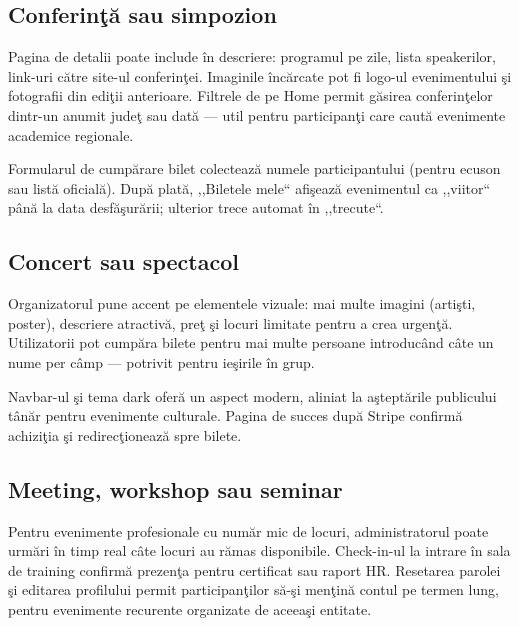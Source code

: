 \subsection{Conferin\c t\u a sau simpozion}

Pagina de detalii poate include \^in descriere: programul pe zile, lista speakerilor, link-uri c\u atre site-ul conferin\c tei. Imaginile \^inc\u arcate pot fi logo-ul evenimentului \c si fotografii din edi\c tii anterioare. Filtrele de pe Home permit g\u asirea conferin\c telor dintr-un anumit jude\c t sau dat\u a — util pentru participan\c ti care caut\u a evenimente academice regionale.

Formularul de cump\u arare bilet colecteaz\u a numele participantului (pentru ecuson sau list\u a oficial\u a). Dup\u a plat\u a, ,,Biletele mele`` afi\c seaz\u a evenimentul ca ,,viitor`` p\^an\u a la data desf\u a\c sur\u arii; ulterior trece automat \^in ,,trecute``.

\subsection{Concert sau spectacol}

Organizatorul pune accent pe elementele vizuale: mai multe imagini (arti\c sti, poster), descriere atractiv\u a, pre\c t \c si locuri limitate pentru a crea urgen\c t\u a. Utilizatorii pot cump\u ara bilete pentru mai multe persoane introduc\^and c\^ate un nume per c\^amp — potrivit pentru ie\c sirile \^in grup.

Navbar-ul \c si tema dark ofer\u a un aspect modern, aliniat la a\c stept\u arile publicului t\^an\u ar pentru evenimente culturale. Pagina de succes dup\u a Stripe confirm\u a achizi\c tia \c si \linebreak redirec\c tioneaz\u a spre bilete.

\subsection{Meeting, workshop sau seminar}

Pentru evenimente profesionale cu num\u ar mic de locuri, administratorul poate urm\u ari \^in timp real c\^ate locuri au r\u amas disponibile. Check-in-ul la intrare \^in sala de training confirm\u a prezen\c ta pentru certificat sau raport HR. Resetarea parolei \c si editarea profilului permit participan\c tilor s\u a-\c si men\c tin\u a contul pe termen lung, pentru evenimente recurente organizate de aceea\c si entitate.


